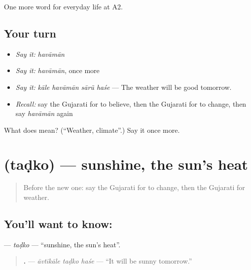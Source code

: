 \begin{grammarlens}[title={What you've built}]
One more word for everyday life at A2.
\end{grammarlens}

\subsection*{Your turn}
\begin{itemize}
\raggedright
  \item \emph{Say it:} \emph{havāmān}
  \item \emph{Say it:} \emph{havāmān}, once more
  \item \emph{Say it:} \emph{kāle havāmān sārũ haśe} — The weather will be good tomorrow.
  \item \emph{Recall:} say the Gujarati for to believe, then the Gujarati for to change, then say \emph{havāmān} again
\end{itemize}

\begin{tcolorbox}[breakable,colback=teal!4,colframe=teal!35!black,title={Before you move on}]
What does  mean? (\textquotedblleft{}Weather, climate\textquotedblright{}.) Say it once more.
\end{tcolorbox}
\section[\texorpdfstring{\gu{તડકો} (taḍko)}{તડકો (taḍko)}]{ (taḍko) — sunshine, the sun's heat}

\label{lesson:GU-C213-tadko}



\begin{quote}
Before the new one: say the Gujarati for to change, then the Gujarati for weather.
\end{quote}

\subsection*{You'll want to know: }
\textbf{} — \emph{taḍko} — \textquotedblleft{}sunshine, the sun's heat\textquotedblright{}.

\begin{quote}
\textbf{  .} — \emph{āvtīkāle taḍko haśe} — \textquotedblleft{}It will be sunny tomorrow.\textquotedblright{}
\end{quote}

